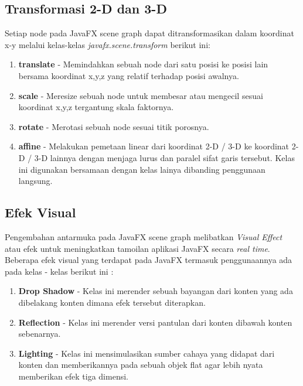 \subsection{Transformasi 2-D dan 3-D}
\label{subs:Layout}
Setiap node pada JavaFX scene graph dapat ditransformasikan dalam koordinat x-y melalui kelas-kelas \textit{javafx.scene.transform} berikut ini:\cite{javafx}
\begin{enumerate}
	\item \textbf{translate} - Memindahkan sebuah node dari satu posisi ke posisi lain bersama koordinat x,y,z yang relatif terhadap posisi awalnya.
	\item \textbf{scale} - Meresize sebuah node untuk membesar atau mengecil sesuai koordinat x,y,z tergantung skala faktornya.
	\item \textbf{rotate} - Merotasi sebuah node sesuai titik porosnya.
	\item \textbf{affine} - Melakukan pemetaan linear dari koordinat 2-D / 3-D ke koordinat 2-D / 3-D lainnya dengan menjaga lurus dan paralel sifat garis tersebut. Kelas ini digunakan bersamaan dengan kelas lainya dibanding penggunaan langsung.
\end{enumerate}

\subsection{Efek Visual}
\label{subs:Efek_Visual}
Pengembahan antarmuka pada JavaFX scene graph melibatkan \textit{Visual Effect} atau efek untuk meningkatkan tamoilan aplikasi JavaFX secara \textit{real time}. Beberapa efek visual yang terdapat pada JavaFX termasuk penggunaannya ada pada kelas - kelas berikut ini :\cite{javafx}
\begin{enumerate}
	\item \textbf{Drop Shadow} - Kelas ini merender sebuah bayangan dari konten yang ada dibelakang konten dimana efek tersebut diterapkan.
	\item \textbf{Reflection} - Kelas ini merender versi pantulan dari konten dibawah konten sebenarnya.
	\item \textbf{Lighting} - Kelas ini mensimulasikan sumber cahaya yang didapat dari konten dan memberikannya pada sebuah objek flat agar lebih nyata memberikan efek tiga dimensi.
\end{enumerate}


